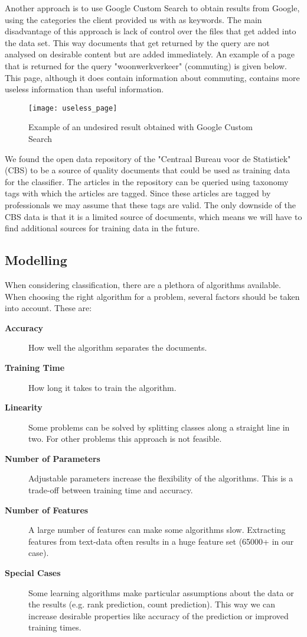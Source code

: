 Another approach is to use Google Custom Search to obtain results from Google, using the categories the client provided us with as keywords. The main disadvantage of this approach is lack of control over the files that get added into the data set. This way documents that get returned by the query are not analysed on desirable content but are added immediately. An example of a page that is returned for the query "woonwerkverkeer" (commuting) is given below. This page, although it does contain information about commuting, contains more useless information than useful information.

\begin{figure}[H]
\centering
\texttt{[image: useless\_page]}
\caption{Example of an undesired result obtained with Google Custom Search}
\label{fig:useless_page}
\end{figure}

We found the open data repository of the "Centraal Bureau voor de Statistiek" (CBS) to be a source of quality documents that could be used as training data for the classifier. The articles in the repository can be queried using taxonomy tags with which the articles are tagged. Since these articles are tagged by professionals we may assume that these tags are valid. The only downside of the CBS data is that it is a limited source of documents, which means we will have to find additional sources for training data in the future.

\subsection{Modelling}
When considering classification, there are a plethora of algorithms available. When choosing the right algorithm for a problem, several factors should be taken into account\cite{MLCheatSheet}. These are:
    \begin{description}
        \item[\textbf{Accuracy}] How well the algorithm separates the documents.
        \item[\textbf{Training Time}] How long it takes to train the algorithm.
        \item[\textbf{Linearity}] Some problems can be solved by splitting classes along a straight line in two. For other problems this approach is not feasible.
        \item[\textbf{Number of Parameters}] Adjustable parameters increase the flexibility of the algorithms. This is a trade-off between training time and accuracy.
        \item[\textbf{Number of Features}] A large number of features can make some algorithms slow. Extracting features from text-data often results in a huge feature set (65000+ in our case).
        \item[\textbf{Special Cases}] Some learning algorithms make particular assumptions about the data or the results (e.g. rank prediction, count prediction). This way we can increase desirable properties like accuracy of the prediction or improved training times. 
    \end{description}

